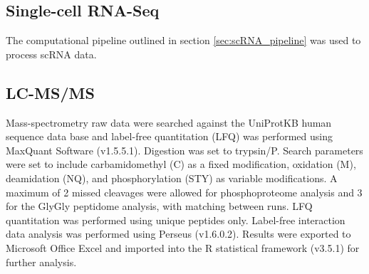 \subsection{Single-cell RNA-Seq}
The computational pipeline outlined in section \ref{sec:scRNA_pipeline} was used to process scRNA data.

\subsection{LC-MS/MS}
Mass-spectrometry raw data were searched against the UniProtKB human sequence data base and label-free quantitation (LFQ) was performed using MaxQuant Software (v1.5.5.1).
Digestion was set to trypsin/P.
Search parameters were set to include carbamidomethyl (C) as a fixed modification, oxidation (M), deamidation (NQ), and phosphorylation (STY) as variable modifications.
A maximum of 2 missed cleavages were allowed for phosphoproteome analysis and 3 for the GlyGly peptidome analysis, with matching between runs.
LFQ quantitation was performed using unique peptides only.
Label-free interaction data analysis was performed using Perseus (v1.6.0.2).
Results were exported to Microsoft Office Excel and imported into the R statistical framework (v3.5.1) for further analysis.



